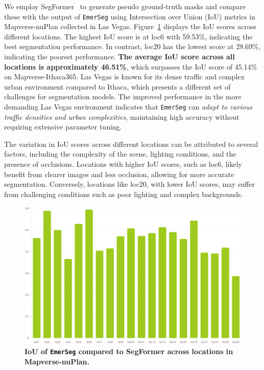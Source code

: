 We employ SegFormer~\cite{xie2021segformer} to generate pseudo ground-truth masks and compare these with the output of \texttt{EmerSeg} using Intersection over Union (IoU) metrics in Mapverse-nuPlan collected in Las Vegas. Figure~\ref{fig:iouvsloc-nuplan} displays the IoU scores across different locations. The highest IoU score is at loc6 with 59.53\%, indicating the best segmentation performance. In contrast, loc20 has the lowest score at 28.69\%, indicating the poorest performance. \textbf{The average IoU score across all locations is approximately 46.51\%}, which surpasses the IoU score of 45.14\% on Mapverse-Ithaca365. Las Vegas is known for its dense traffic and complex urban environment compared to Ithaca, which presents a different set of challenges for segmentation models. The improved performance in the more demanding Las Vegas environment indicates that \texttt{EmerSeg} can \textit{adapt to various traffic densities and urban complexities}, maintaining high accuracy without requiring extensive parameter tuning.

The variation in IoU scores across different locations can be attributed to several factors, including the complexity of the scene, lighting conditions, and the presence of occlusions. Locations with higher IoU scores, such as loc6, likely benefit from clearer images and less occlusion, allowing for more accurate segmentation. Conversely, locations like loc20, with lower IoU scores, may suffer from challenging conditions such as poor lighting and complex backgrounds.




\begin{figure}[ht]
    \centering
    \includegraphics[width=\linewidth]{figs_compressed/nuplan-iou-locations.png}
    \caption{\textbf{IoU of \texttt{EmerSeg} compared to SegFormer across locations in Mapverse-nuPlan.}}
    \label{fig:iouvsloc-nuplan}
\end{figure}


